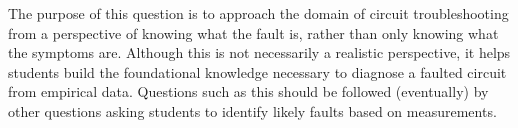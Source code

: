 
The purpose of this question is to approach the domain of circuit troubleshooting from a perspective of knowing what the fault is, rather than only knowing what the symptoms are.  Although this is not necessarily a realistic perspective, it helps students build the foundational knowledge necessary to diagnose a faulted circuit from empirical data.  Questions such as this should be followed (eventually) by other questions asking students to identify likely faults based on measurements.




